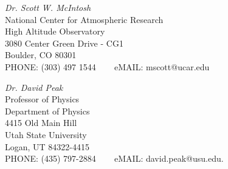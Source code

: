 \documentclass[letterpaper,10pt]{article}
\def\footerlink{}
\begin{document}

  \begin{tabbing}
 \emph{Dr. Scott W. McIntosh}\\
National Center for Atmospheric Research\\
High Altitude Observatory \\
 3080 Center Green Drive - CG1	 \\
Boulder, CO 80301	  \\ 
PHONE:  (303) 497 1544  \,\,\,\,\,\,\,\,\, eMAIL: mscott@ucar.edu
\end{tabbing}



  \begin{tabbing}
 \emph{Dr. David Peak}\\
 Professor of Physics \\
Department of Physics \\
4415 Old Main Hill \\
Utah State University \\
Logan, UT 84322-4415  \\ 
PHONE:  (435) 797-2884  \,\,\,\,\,\,\,\,\, eMAIL: david.peak@usu.edu.
\end{tabbing}






\end{document}
